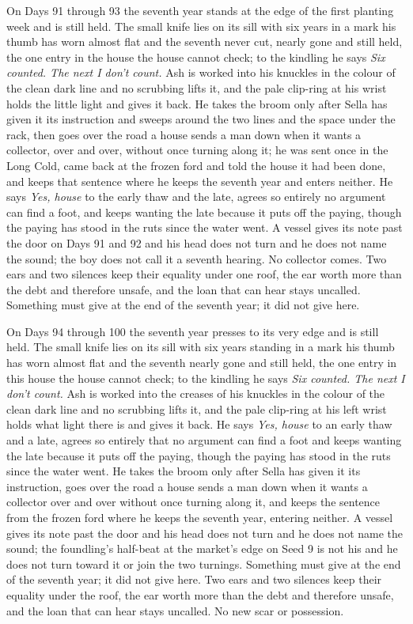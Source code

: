\documentclass{design/chronicle}
\begin{document}
{On Days 91 through 93 the seventh year stands at the edge of the first planting week and is still held. The small knife lies on its sill with six years in a mark his thumb has worn almost flat and the seventh never cut, nearly gone and still held, the one entry in the house the house cannot check; to the kindling he says \emph{Six counted. The next I don’t count.} Ash is worked into his knuckles in the colour of the clean dark line and no scrubbing lifts it, and the pale clip-ring at his wrist holds the little light and gives it back. He takes the broom only after Sella has given it its instruction and sweeps around the two lines and the space under the rack, then goes over the road a house sends a man down when it wants a collector, over and over, without once turning along it; he was sent once in the Long Cold, came back at the frozen ford and told the house it had been done, and keeps that sentence where he keeps the seventh year and enters neither. He says \emph{Yes, house} to the early thaw and the late, agrees so entirely no argument can find a foot, and keeps wanting the late because it puts off the paying, though the paying has stood in the ruts since the water went. A vessel gives its note past the door on Days 91 and 92 and his head does not turn and he does not name the sound; the boy does not call it a seventh hearing. No collector comes. Two ears and two silences keep their equality under one roof, the ear worth more than the debt and therefore unsafe, and the loan that can hear stays uncalled. Something must give at the end of the seventh year; it did not give here.

On Days 94 through 100 the seventh year presses to its very edge and is still held. The small knife lies on its sill with six years standing in a mark his thumb has worn almost flat and the seventh nearly gone and still held, the one entry in this house the house cannot check; to the kindling he says \emph{Six counted. The next I don’t count.} Ash is worked into the creases of his knuckles in the colour of the clean dark line and no scrubbing lifts it, and the pale clip-ring at his left wrist holds what light there is and gives it back. He says \emph{Yes, house} to an early thaw and a late, agrees so entirely that no argument can find a foot and keeps wanting the late because it puts off the paying, though the paying has stood in the ruts since the water went. He takes the broom only after Sella has given it its instruction, goes over the road a house sends a man down when it wants a collector over and over without once turning along it, and keeps the sentence from the frozen ford where he keeps the seventh year, entering neither. A vessel gives its note past the door and his head does not turn and he does not name the sound; the foundling’s half-beat at the market’s edge on Seed 9 is not his and he does not turn toward it or join the two turnings. Something must give at the end of the seventh year; it did not give here. Two ears and two silences keep their equality under the roof, the ear worth more than the debt and therefore unsafe, and the loan that can hear stays uncalled. No new scar or possession.

}
\end{document}
